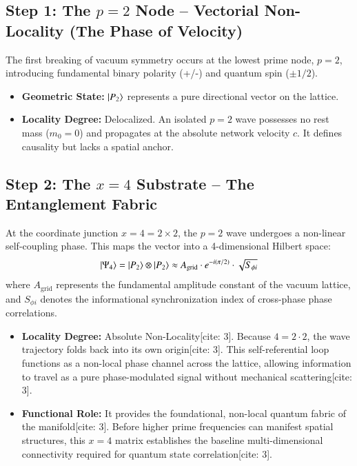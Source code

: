 \documentclass[twocolumn]{aa}
\begin{document}
\subsection{Step 1: The $p=2$ Node – Vectorial Non-Locality (The Phase of Velocity)}
The first breaking of vacuum symmetry occurs at the lowest prime node, $p=2$, introducing fundamental binary polarity (+/-) and quantum spin ($\pm 1/2$).
\begin{itemize}
    \item \textbf{Geometric State:} $\ket{P_2}$ represents a pure directional vector on the lattice.
    \item \textbf{Locality Degree:} Delocalized. An isolated $p=2$ wave possesses no rest mass ($m_0 = 0$) and propagates at the absolute network velocity $c$. It defines causality but lacks a spatial anchor.
\end{itemize}

\subsection{Step 2: The $x=4$ Substrate – The Entanglement Fabric}
At the coordinate junction $x = 4 = 2 \times 2$, the $p=2$ wave undergoes a non-linear self-coupling phase. This maps the vector into a 4-dimensional Hilbert space:
\begin{equation}
\ket{\Psi_4} = \ket{P_2} \otimes \ket{P_2} \approx A_{\text{grid}} \cdot e^{-i(\pi/2)} \cdot \sqrt{S_{\phi i}}
\end{equation}
where $A_{\text{grid}}$ represents the fundamental amplitude constant of the vacuum lattice, and $S_{\phi i}$ denotes the informational synchronization index of cross-phase phase correlations.
\begin{itemize}
    \item \textbf{Locality Degree:} Absolute Non-Locality[cite: 3]. Because $4 = 2 \cdot 2$, the wave trajectory folds back into its own origin[cite: 3]. This self-referential loop functions as a non-local phase channel across the lattice, allowing information to travel as a pure phase-modulated signal without mechanical scattering[cite: 3].
    \item \textbf{Functional Role:} It provides the foundational, non-local quantum fabric of the manifold[cite: 3]. Before higher prime frequencies can manifest spatial structures, this $x=4$ matrix establishes the baseline multi-dimensional connectivity required for quantum state correlation[cite: 3].
\end{itemize}
\end{document}
